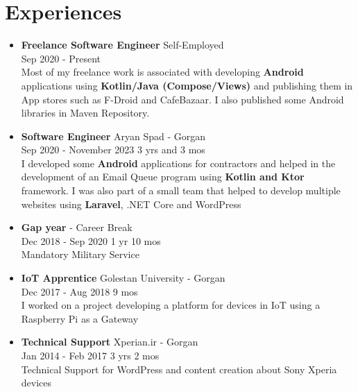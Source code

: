 \section*{\LARGE{Experiences}}
\begin{itemize}
    \item \large{\textbf{Freelance Software Engineer} \hfill Self-Employed\\}
    \normalsize{Sep 2020 - Present\\
    Most of my freelance work is associated with developing \textbf{Android} applications using
    \textbf{Kotlin/Java (Compose/Views)} and publishing them in App stores such as F-Droid and CafeBazaar.
    I also published some Android libraries in Maven Repository.}

    \vspace{1em}

    \item \large{\textbf{Software Engineer} \hfill Aryan Spad}\normalsize{ - Gorgan}\\
    \normalsize{Sep 2020 - November 2023 \hfill 3 yrs and 3 mos\\I developed some \textbf{Android} applications for contractors
    and helped in the development of an Email Queue program using \textbf{Kotlin and Ktor} framework.
    I was also part of a small team that helped to develop multiple websites using \textbf{Laravel}, .NET Core and WordPress}

    \vspace{1em}

    \item \large{\textbf{Gap year} - Career Break\\}\normalsize{Dec 2018 - Sep 2020 \hfill 1 yr 10 mos\\ Mandatory Military Service}

    \vspace{1em}

    \item \large{\textbf{IoT Apprentice} \hfill Golestan University}\normalsize{ - Gorgan}\\
    \normalsize{Dec 2017 - Aug 2018 \hfill 9 mos\\I worked on a project developing a platform for devices in IoT using a Raspberry Pi as a Gateway}

    \vspace{1em}

    \item \large{\textbf{Technical Support} \hfill Xperian.ir}\normalsize{ - Gorgan}\\
    \normalsize{Jan 2014 - Feb 2017 \hfill 3 yrs 2 mos\\Technical Support for WordPress and content creation about Sony Xperia devices}
\end{itemize}